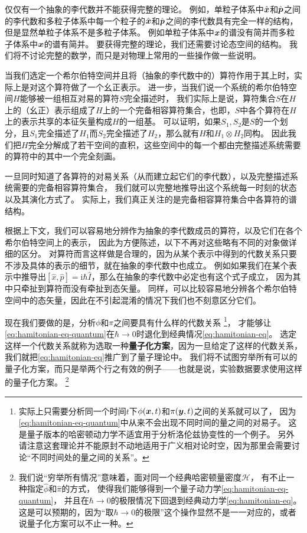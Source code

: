 \documentclass[UTF8, a4paper]{ctexart}
\newcommand*{\ii}{\mathrm{i}}
\begin{document}
仅仅有一个抽象的李代数并不能获得完整的理论。
例如，单粒子体系中$\hat{\vb*{x}}$和$\hat{\vb*{p}}$之间的李代数和多粒子体系中每一个粒子的$\hat{\vb*{x}}$和$\hat{\vb*{p}}$之间的李代数具有完全一样的结构，但是显然单粒子体系不是多粒子体系。
例如单粒子体系中$\vb*{x}$的谱没有简并而多粒子体系中$\vb*{x}$的谱有简并。
要获得完整的理论，我们还需要讨论态空间的结构。
我们将不讨论完整的数学，而只是对物理上常用的一些操作做一些说明。

当我们选定一个希尔伯特空间并且将（抽象的李代数中的）算符作用于其上时，实际上是对这个算符做了一个幺正表示。
进一步，当我们说一个系统的希尔伯特空间$H$能够被一组相互对易的算符$S$完全描述时，
我们实际上是说，算符集合$S$在$H$上的（幺正）表示组成了$H$上的一个完备相容算符集合，也即，$S$中各个算符在$H$上的表示共享的本征矢量构成$H$的一组基。
可以证明，如果$S_1,S_2$是$S$的一个划分，且$S_1$完全描述了$H_1$而$S_2$完全描述了$H_2$，那么就有$H$和$H_1 \otimes H_2$同构。
因此我们把$H$完全分解成了若干空间的直积，这些空间中的每一个都由完整描述系统需要的算符中的其中一个完全刻画。

一旦同时知道了各算符的对易关系（从而建立起它们的李代数），以及完整描述系统需要的完备相容算符集合，
我们就可以完整地推导出这个系统每一时刻的状态以及其演化方式了。
实际上，我们真正关注的是完备相容算符集合中各算符的谱结构。

根据上下文，我们可以容易地分辨作为抽象的李代数成员的算符，以及它们在各个希尔伯特空间上的表示，
因此为方便陈述，以下不再对这些略有不同的对象做详细的区分。
对算符而言这样做是合理的，因为从某个表示中得到的代数关系只要不涉及具体的表示的细节，就在抽象的李代数中也成立。
例如如果我们在某个表示中推导出$[\hat{x}, \hat{p}] = \ii \hbar \hat{I}$，那么在抽象的李代数中必定也有这个式子成立，
因为其中只牵扯到算符而没有牵扯到态矢量。
同样，可以比较容易地分辨各个希尔伯特空间中的态矢量，因此在不引起混淆的情况下我们也不刻意区分它们。

现在我们要做的是，分析$\phi$和$\pi$之间要具有什么样的代数关系%
\footnote{实际上只需要分析同一个时间$t$下$\phi(\vb*{x}, t)$和$\pi(\vb*{y}, t)$之间的关系就可以了，
因为\eqref{eq:hamitonian-eq-quantum}中从来不会出现不同时间的量之间的对易子。
这是量子版本的哈密顿动力学不适宜用于分析洛伦兹协变性的一个例子。
另外请注意这套理论并不能原封不动地适用于广义相对论时空，因为那里会需要讨论“不同时间处的量之间的关系”。}，
才能够让\eqref{eq:hamitonian-eq-quantum}在$\hbar \to 0$时退化到经典情况\eqref{eq:hamitonian-eq}。
选定这样一个代数关系就称为选取一种\textbf{量子化方案}，因为一旦给定了这样的代数关系，我们就把\eqref{eq:hamitonian-eq}推广到了量子理论中。
我们将不试图穷举所有可以的量子化方案，而只是举两个行之有效的例子——也就是说，实验数据要求使用这样的量子化方案。%
\footnote{我们说“穷举所有情况”意味着，面对同一个经典哈密顿量密度$\mathcal{H}$，
有不止一种指定$\hat{\phi}$和$\hat{\pi}$的方式，
使得我们能够得到一个量子动力学\eqref{eq:hamitonian-eq-quantum}，
并且在$\hbar \to 0$的极限情况下回退到经典动力学\eqref{eq:hamitonian-eq}。
这是可以预期的，因为“取$\hbar\to 0$的极限”这个操作显然不是一一对应的，或者说量子化方案可以不止一种。
}
\end{document}
